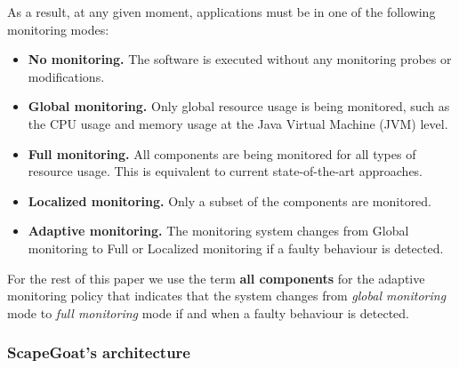 As a result, at any given moment, applications must be in one of the following monitoring modes:
\begin{itemize}
\leftskip -.2in
	\item \textbf{No monitoring.} The software is executed without any monitoring probes or modifications.
	\item \textbf{Global monitoring.} Only global resource usage is being monitored, such as the CPU usage and memory usage at the Java Virtual Machine (JVM) level.
	\item \textbf{Full monitoring.} All components are being monitored for all types of resource usage. This is equivalent to current state-of-the-art approaches.
	\item \textbf{Localized monitoring.} Only a subset of the components are monitored.
	\item \textbf{Adaptive monitoring.} The monitoring system changes from Global monitoring to Full or Localized monitoring if a faulty behaviour is detected.
\end{itemize}
For the rest of this paper we use the term \textbf{all components} for the adaptive monitoring policy that indicates that the system changes from \emph{global monitoring} mode to \emph{full monitoring} mode if and when a faulty behaviour is detected.



\subsubsection{ScapeGoat's architecture}

